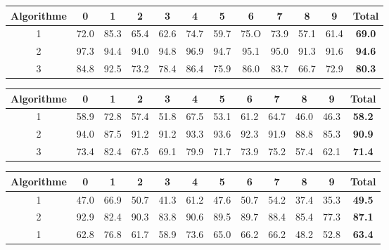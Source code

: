 \documentclass[a4paper,11pt,twoside]{report}
\begin{document}
\begin{center}

\begin{tabular}{ |c||c|c|c|c|c|c|c|c|c|c|c| } 
\hline
 Algorithme & 0 & 1 & 2 & 3 & 4 & 5 & 6 & 7 & 8 & 9 & \textbf{Total} \\ 
  \hline
  \hline
  1 & 72.0 & 85.3 & 65.4 & 62.6 & 74.7 & 59.7 & 75.O & 73.9 & 57.1 & 61.4 & \textbf{69.0} \\
 \hline
  2 & 97.3 & 94.4 & 94.0 & 94.8 & 96.9 & 94.7 & 95.1 & 95.0 & 91.3 & 91.6 & \textbf{94.6} \\
  \hline
  3 & 84.8 & 92.5 & 73.2 & 78.4 & 86.4 & 75.9 & 86.0 & 83.7 & 66.7 & 72.9 & \textbf{80.3} \\
 \hline
\end{tabular}

\begin{tabular}{ |c||c|c|c|c|c|c|c|c|c|c|c| } 
\hline
 Algorithme & 0 & 1 & 2 & 3 & 4 & 5 & 6 & 7 & 8 & 9 & \textbf{Total} \\ 
  \hline
  \hline
  1 & 58.9 & 72.8 & 57.4 & 51.8 & 67.5 & 53.1 & 61.2 & 64.7 & 46.0 & 46.3 & \textbf{58.2} \\
 \hline
  2 & 94.0 & 87.5 & 91.2 & 91.2 & 93.3 & 93.6 & 92.3 & 91.9 & 88.8 & 85.3 & \textbf{90.9} \\
  \hline
  3 & 73.4 & 82.4 & 67.5 & 69.1 & 79.9 & 71.7 & 73.9 & 75.2 & 57.4 & 62.1 & \textbf{71.4} \\
 \hline
\end{tabular}

\begin{tabular}{ |c||c|c|c|c|c|c|c|c|c|c|c| } 
\hline
 Algorithme & 0 & 1 & 2 & 3 & 4 & 5 & 6 & 7 & 8 & 9 & \textbf{Total} \\ 
  \hline
  \hline
 1 & 47.0 & 66.9 & 50.7 & 41.3 & 61.2 & 47.6 & 50.7 & 54.2 & 37.4 & 35.3 & \textbf{49.5} \\
 \hline
 2 & 92.9 & 82.4 & 90.3 & 83.8 & 90.6 & 89.5 & 89.7 & 88.4 & 85.4 & 77.3 & \textbf{87.1} \\
  \hline
 1 & 62.8 & 76.8 & 61.7 & 58.9 & 73.6 & 65.0 & 66.2 & 66.2 & 48.2 & 52.8 & \textbf{63.4} \\
 \hline
\end{tabular}
\end{center}
\end{document}
